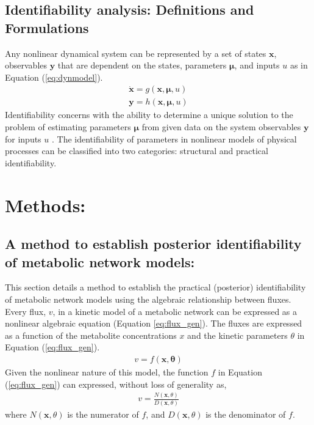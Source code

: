 \documentclass[10pt]{article}
\begin{document}
	
	
	\subsection{Identifiability analysis: Definitions and Formulations}
	Any nonlinear dynamical system can be represented by a set of states $\mathbf{x}$, observables $\mathbf{y}$ that are dependent on the states, parameters $\mathbf{\mu}$, and inputs $u$ as in Equation (\ref{eq:dynmodel}). 
	\begin{subequations}\label{eq:dynmodel}
		\begin{align}
		\dot{\mathbf{x}} = g(\mathbf{x},\mathbf{\mu},u)\\
		\mathbf{y} = h(\mathbf{x},\mathbf{\mu},u)
		\end{align}
	\end{subequations}
	Identifiability concerns with the ability to determine a unique solution to the problem of estimating parameters $\mathbf{\mu}$ from given data on the system observables $\mathbf{y}$ for inputs $u$ \parencite{McLean2012}.	The identifiability of parameters in nonlinear models of physical processes can be classified into two categories: structural and practical identifiability. 
		
	
	
	\section{Methods:}
	\subsection{A method to establish posterior identifiability of metabolic network models:}
	This section details a method to establish the practical (posterior) identifiability of metabolic network models using the algebraic relationship between fluxes.
	Every flux, $v$, in a kinetic model of a metabolic network can be expressed as a nonlinear algebraic equation (Equation \ref{eq:flux_gen}). The fluxes are expressed as a function of the metabolite concentrations $x$ and the kinetic parameters $\theta$ in Equation (\ref{eq:flux_gen}).
	\begin{align}\label{eq:flux_gen}
	v = f(\mathbf{x},\mathbf{\theta})
	\end{align}
	Given the nonlinear nature of this model, the function $f$ in Equation (\ref{eq:flux_gen}) can expressed, without loss of generality as,
	\begin{align}\label{eq:nr_dr}
	v = \frac{N(\mathbf{x},\theta)}{D(\mathbf{x},\theta)}
	\end{align}
	where $N(\mathbf{x},\theta)$ is the numerator of $f$, and $D(\mathbf{x},\theta)$ is the denominator of $f$.
	
\end{document}
